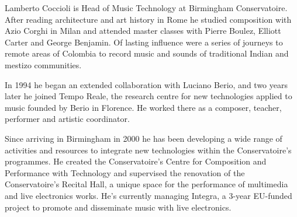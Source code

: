 \documentclass[10pt,journal,final]{IEEEtran}
\begin{document}
\begin{biography}
Lamberto Coccioli is Head of Music Technology at Birmingham Conservatoire. After reading architecture and art history
in Rome he studied composition with Azio Corghi in Milan and attended master classes with Pierre Boulez, Elliott Carter
and George Benjamin. Of lasting influence were a series of journeys to remote areas of Colombia to record music and
sounds of traditional Indian and mestizo communities.

In 1994 he began an extended collaboration with Luciano Berio, and two years later he joined Tempo Reale, the research
centre for new technologies applied to music founded by Berio in Florence. He worked there as a composer, teacher,
performer and artistic coordinator.

Since arriving in Birmingham in 2000 he has been developing a wide range of activities and resources to integrate new
technologies within the Conservatoire's programmes. He created the Conservatoire’s Centre for Composition and
Performance with Technology and supervised the renovation of the Conservatoire’s Recital Hall, a unique space for the
performance of multimedia and live electronics works. He's currently managing Integra, a 3-year EU-funded project to
promote and disseminate music with live electronics.
\end{biography}
\end{document}
